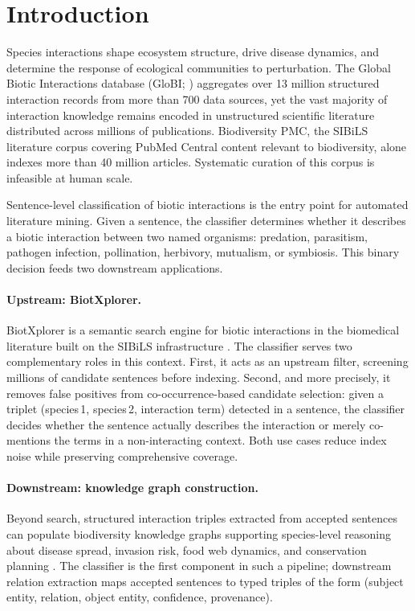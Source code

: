 \documentclass[12pt,a4paper]{article}
\begin{document}
\section{Introduction}
\label{sec:intro}

Species interactions shape ecosystem structure, drive disease dynamics,
and determine the response of ecological communities to perturbation.
The Global Biotic Interactions database (GloBI; \citealt{poelen2014global})
aggregates over 13 million structured interaction records from more than 700
data sources, yet the vast majority of interaction knowledge remains encoded
in unstructured scientific literature distributed across millions of
publications. Biodiversity PMC, the SIBiLS \citep{mottin2021sibils} literature
corpus covering PubMed Central content relevant to biodiversity, alone indexes
more than 40 million articles. Systematic curation of this corpus is
infeasible at human scale.

Sentence-level classification of biotic interactions is the entry point
for automated literature mining. Given a sentence, the classifier determines
whether it describes a biotic interaction between two named organisms:
predation, parasitism, pathogen infection, pollination, herbivory, mutualism,
or symbiosis. This binary decision feeds two downstream applications.

\paragraph{Upstream: BiotXplorer.}
BiotXplorer \citep{sibils2023biotxplorer} is a semantic search engine for
biotic interactions in the biomedical literature built on the SIBiLS
infrastructure \citep{mottin2021sibils}. The classifier serves two complementary
roles in this context. First, it acts as an upstream filter, screening millions
of candidate sentences before indexing. Second, and more precisely, it removes
false positives from co-occurrence-based candidate selection: given a triplet
(species\,1, species\,2, interaction term) detected in a sentence, the
classifier decides whether the sentence actually describes the interaction or
merely co-mentions the terms in a non-interacting context. Both use cases
reduce index noise while preserving comprehensive coverage.

\paragraph{Downstream: knowledge graph construction.}
Beyond search, structured interaction triples extracted from accepted sentences
can populate biodiversity knowledge graphs \citep{chen2023biodiversity}
supporting species-level reasoning about disease spread, invasion risk,
food web dynamics, and conservation planning \citep{poisot2021global}.
The classifier is the first component in such a pipeline; downstream relation
extraction maps accepted sentences to typed triples of the form
(subject entity, relation, object entity, confidence, provenance).
\end{document}
